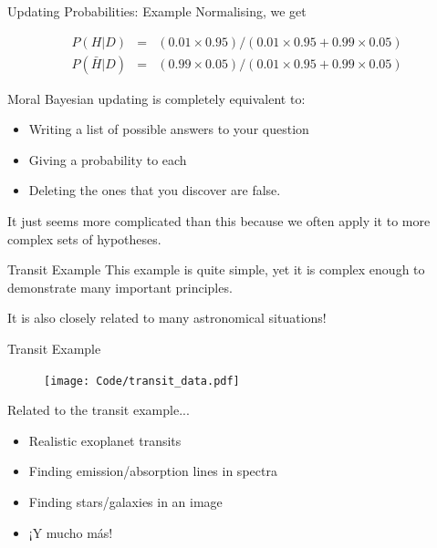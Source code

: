 \begin{frame}[t]{Updating Probabilities: Example}
Normalising, we get

\begin{eqnarray*}
P(H | D) &=& (0.01 \times 0.95)/(0.01 \times 0.95 + 0.99\times0.05)\\
P(\bar{H} | D) &=& (0.99 \times 0.05)/(0.01 \times 0.95 + 0.99\times0.05)
\end{eqnarray*}
\end{frame}

\begin{frame}[t]{Moral}
Bayesian updating is completely equivalent to:
\begin{itemize}
\item Writing a list of possible answers to your question
\item Giving a probability to each
\item Deleting the ones that you discover are false.
\end{itemize}

It just seems more complicated than this because we often apply it to more
complex sets of hypotheses.
\end{frame}



\begin{frame}[t]{Transit Example}
This example is quite simple, yet it is complex enough to demonstrate many
important principles.
\vspace{1cm}

It is also closely related to many astronomical situations!
\end{frame}


\begin{frame}[t]{Transit Example}
\begin{figure}
\texttt{[image: Code/transit\_data.pdf]}
\end{figure}
\end{frame}



\begin{frame}[t]{Related to the transit example...}
\begin{itemize}
\item Realistic exoplanet transits
\item Finding emission/absorption lines in spectra
\item Finding stars/galaxies in an image
\item ¡Y mucho más!
\end{itemize}
\end{frame}


